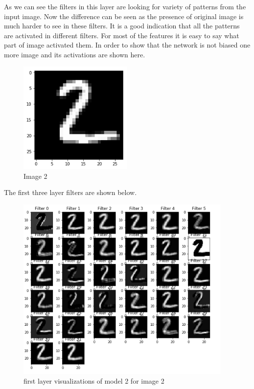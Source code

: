  \newpage \noindent As we can see the filters in this layer are looking for variety of patterns from the input image. Now the difference can be seen as the presence of original image is much harder to see in these filters. It is a good indication that all the patterns are activated in different filters. For most of the features it is easy to say what part of image activated them. In order to show that the network is not biased one more image and its activations are shown here.
\begin{figure}[h]
    \centering
    \includegraphics[width=0.5\textwidth]{thesis_template/images/2.png}
    \caption{\small Image 2}
    \label{}
    \end{figure}
\newpage The first three layer filters are shown below.
\begin{figure}[h!]
    \centering
    \includegraphics[width=0.95\textwidth]{thesis_template/images/21.png}
    \caption{\small first layer visualizations of model 2 for image 2}
    \label{}
    \end{figure}
    
